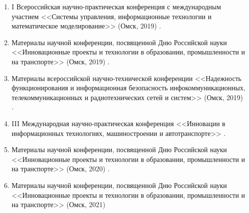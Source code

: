 \begin{enumerate}
\item I Всероссийская научно-практическая конференция с международным участием <<Системы управления, информационные технологии и математическое моделирование>> (Омск, 2019) \cite{comparative_analysis_2019}.

\item Материалы научной конференции, посвященной Дню Российской науки <<Инновационные проекты и технологии в образовании, промышленности и на транспорте>> (Омск, 2019) \cite{comparative_analysis2019}.

\item Материалы всероссийской научно-технической конференции <<Надежность функционирования и информационная безопасность инфокоммуникационных, телекоммуникационных и радиотехнических сетей и систем>> (Омск, 2019) \cite{modern_information2019}. 

\item III Международная научно-практическая конференция <<Инновации в информационных технологиях, машиностроении и автотранспорте>> \cite{complexity_assessment2019}.

\item Материалы научной конференции, посвященной Дню Российской науки <<Инновационные проекты и технологии в образовании, промышленности и на транспорте>> (Омск, 2020) \cite{comparative_study2020}.  

\item Материалы научной конференции, посвященной Дню Российской науки <<Инновационные проекты и технологии в образовании, промышленности и на транспорте>> (Омск, 2021) \cite{altman2021boundary}
\end{enumerate}

